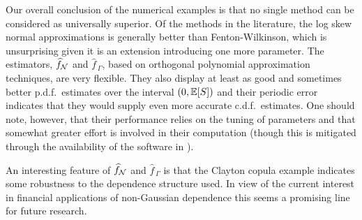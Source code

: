 


Our overall conclusion of the numerical examples is that no single method can
be considered as universally superior. Of the methods in the literature,
the log skew normal approximations is generally better than Fenton-Wilkinson,
which is unsurprising given it is an extension introducing one more parameter.
The estimators, $\widehat{f}_{\mathcal{N}}$ and $\widehat{f}_{\,\Gamma}$, based on orthogonal polynomial approximation techniques, are very flexible. They also display at least as good and sometimes better p.d.f.\ estimates over the interval $(0, \operatorname{{\mathbb E}}[S])$ and their periodic error indicates that they would supply even more accurate c.d.f.\ estimates. One should note, however, that their
performance relies on the tuning of parameters and that somewhat
greater effort is involved in their computation (though this is mitigated through the availability
of the software in \cite{OrthogoCode}).

An interesting feature of $\widehat{f}_{\mathcal{N}}$ and $\widehat{f}_{\,\Gamma}$ is that
the Clayton copula example indicates some robustness to the dependence structure used.
In view of the current interest in financial applications of non-Gaussian dependence this
seems a promising line for future research.


